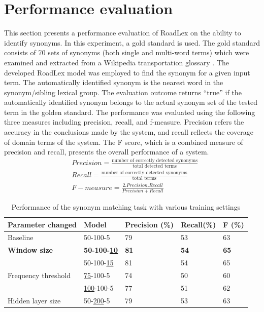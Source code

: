 \documentclass[Journal,InsideFigs, DoubleSpace]{ascelike} %
\begin{document}
\section{Performance evaluation} \label{sec:eval_RoadLex}
This section presents a performance evaluation of RoadLex on the ability to identify synonyms. In this experiment, a gold standard  is used. The gold standard consists of 70 sets of synonyms (both single and multi-word terms) which were examined and extracted from a Wikipedia transportation glossary \cite{wikipedia16}. The developed RoadLex model was employed to find the synonym for a given input term. The automatically identified synonym is the nearest word in the synonym/sibling lexical group. The evaluation outcome returns ``true'' if the automatically identified synonym belongs to the actual synonym set of the tested term in the golden standard. The performance was evaluated using the following three measures including precision, recall, and f-measure. Precision refers the accuracy in the conclusions made by the system, and recall reflects the coverage of domain terms of the system. The F score, which is a combined measure of precision and recall, presents the overall performance of a system. 
%
\begin{align} 
&Precision = \frac{\text{number of correctly detected synonyms}}{\text{total detected terms}}  \\
&Recall = \frac{\text{number of correctly detected synonyms}}{\text{total terms}}  \\ 
&F-measure = \frac{2.Precision.Recall}{Precision+Recall}
\end{align}
\begin{table} [b] 
	\caption{Performance of the synonym matching task with various training settings}
	\label{table:eval_syn_par_effect}
	\centering
	\small
	\renewcommand{\arraystretch}{1.25}
	\begin{tabular}{l l l l l }
		\hline
		\hline
		\textbf{Parameter changed} & \textbf{Model} & \textbf{Precision (\%)}  & \textbf{Recall(\%)} & \textbf{F (\%)}\\
		\hline
		Baseline	&	50-100-5	&79		&53		&63\\
		\hline
		\textbf{Window size}	&\textbf{50-100-\underline{10}}	&\textbf{81}		&\textbf{54}		&\textbf{65}\\
		&50-100-\underline{15}	&81		&54		&65\\
		\hline		
		Frequency threshold	&\underline{75}-100-5	&74		&50		&60\\
		&\underline{100}-100-5	&77		&51		&62\\
		\hline
		Hidden layer size	&50-\underline{200}-5	&79		&53		&63\\
		\hline
		\hline
	\end{tabular}
	\normalsize
\end{table}
\end{document}
